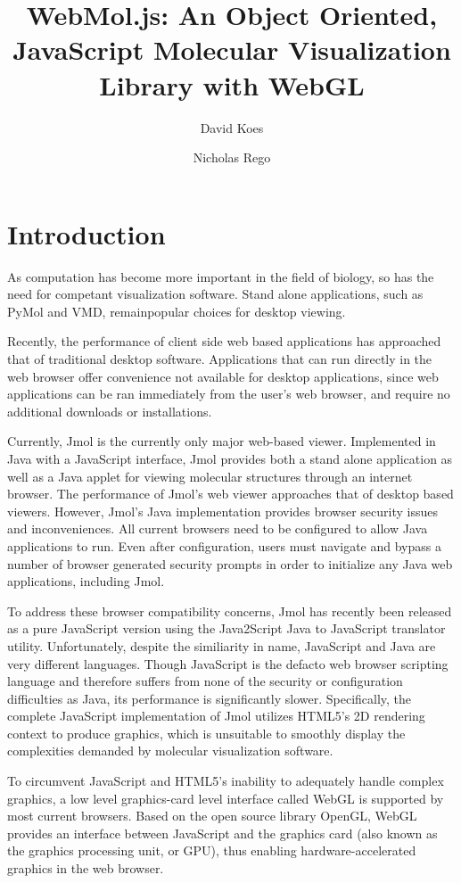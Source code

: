\documentclass[]{article}
\title{WebMol.js: An Object Oriented, JavaScript Molecular Visualization Library with WebGL}
\author{David Koes \and Nicholas Rego}
\begin{document}
\maketitle

\section{Introduction}
As computation has become more important in the field of biology, so has the need for competant visualization software. Stand alone applications, such as PyMol and VMD, remainpopular choices for desktop viewing.  

Recently, the performance of client side web based applications has approached that of traditional desktop software. Applications that can run directly in the web browser offer convenience not available for desktop applications, since web applications can be ran immediately from the user's web browser, and require no additional downloads or installations.

Currently, Jmol is the currently only major web-based viewer.  Implemented in Java with a JavaScript interface, Jmol provides both a stand alone application as well as a Java applet for viewing molecular structures through an internet browser.  The performance of Jmol's web viewer approaches that of desktop based viewers. However, Jmol's Java implementation provides browser security issues and inconveniences.  All current browsers need to be configured to allow Java applications to run.  Even after configuration, users must navigate and bypass a number of browser generated security prompts in order to initialize any Java web applications, including Jmol.  

To address these browser compatibility concerns, Jmol has recently been released as a pure JavaScript version using the Java2Script Java to JavaScript translator utility.  Unfortunately, despite the similiarity in name, JavaScript and Java are very different languages. Though JavaScript is the defacto web browser scripting language and therefore suffers from none of the security or configuration difficulties as Java, its performance is significantly slower.  Specifically, the complete JavaScript implementation of Jmol utilizes HTML5's 2D rendering context to produce graphics, which is unsuitable to smoothly display the complexities demanded by molecular visualization software.  

To circumvent JavaScript and HTML5's inability to adequately handle complex graphics, a low level graphics-card level interface called WebGL is supported by most current browsers.  Based on the open source library OpenGL, WebGL provides an interface between JavaScript and the graphics card (also known as the graphics processing unit, or GPU), thus enabling hardware-accelerated graphics in the web browser.
\end{document}
